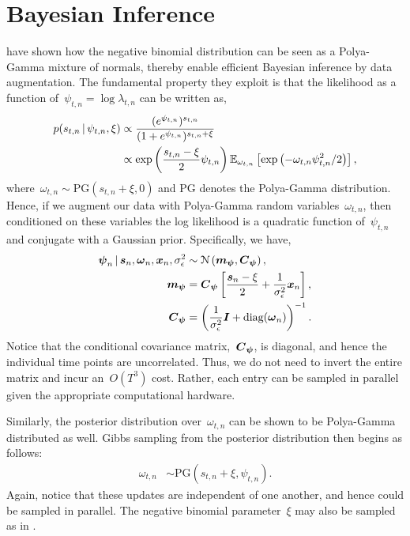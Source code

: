 \documentclass[aos]{imsart} %
\begin{document}
\section{Bayesian Inference}
\citet{Zhou2012} have shown how the negative binomial distribution can be seen as a Polya-Gamma mixture of normals, thereby enable efficient Bayesian inference by data augmentation. The fundamental  property they exploit is that the likelihood as a function of~${\psi_{t,n}=\log \lambda_{t,n}}$ can be written as,
\begin{align}
p(s_{t,n} \given \psi_{t,n}, \xi) &\propto \frac{(e^{\psi_{t,n}})^{s_{t,n}}}{(1 + e^{\psi_{t,n}})^{s_{t,n} + \xi}} \\
& \propto  \exp \left(\frac{s_{t,n}-\xi}{2} \psi_{t,n}\right) \mathbb{E}_{\omega_{t,n}}\left[ \exp\left(-\omega_{t,n} \psi_{t,n}^2 / 2\right)\right],
\end{align}
where~${\omega_{t,n} \sim \text{PG} (s_{t,n}+\xi, 0)}$ and PG denotes the Polya-Gamma distribution. Hence, if we augment our data with Polya-Gamma random variables~${\omega_{t,n}}$, then conditioned on these variables the log likelihood is a quadratic function of~$\psi_{t,n}$ and conjugate with a Gaussian prior.  Specifically, we have,
\begin{align}
\bpsi_n \given \bs_n, \boldsymbol{\omega}_n, \bx_n, \sigma_\epsilon^2 &\sim \distNormal \left( \bbm_{\bpsi}, \bC_{\bpsi}  \right), \\
~
\nonumber \bbm_{\bpsi} &= \bC_{\bpsi} \left[ \frac{\bs_n - \xi}{2}  + \frac{1}{\sigma_{\epsilon}^2} \bx_n \right], \\
~
\nonumber \bC_{\bpsi} &= \left(\frac{1}{\sigma_{\epsilon}^2}\bI + \text{diag}(\boldsymbol{\omega}_n)\right)^{-1}.
\end{align}
Notice that the conditional covariance matrix,~$\boldsymbol{C}_{\boldsymbol{\psi}}$, is diagonal, and hence the individual time points are uncorrelated. Thus, we do not need to invert the entire matrix and incur an~$O(T^3)$ cost. Rather, each entry can be sampled in parallel given the appropriate computational hardware.

Similarly, the posterior distribution over~$\omega_{t,n}$ can be shown to be Polya-Gamma distributed as well. Gibbs sampling from the posterior distribution then begins as follows:
\begin{align}
\omega_{t,n} &\sim \text{PG}(s_{t,n} + \xi, \psi_{t,n}).
\end{align}
Again, notice that these updates are independent of one another, and hence could be sampled in parallel. The negative binomial parameter~$\xi$ may also be sampled as in \citep{Zhou2012}.
\end{document}
